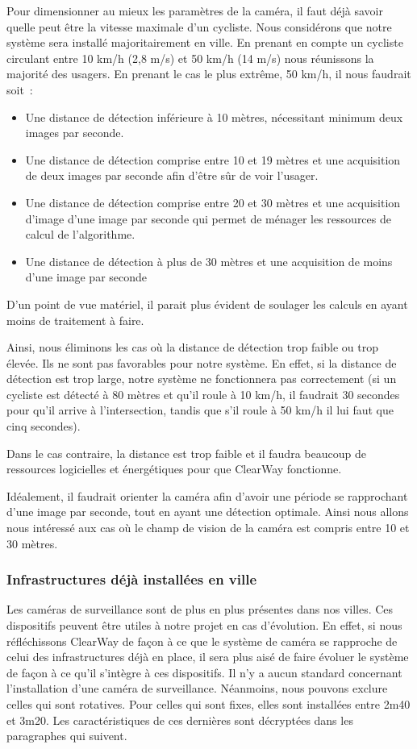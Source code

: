 Pour dimensionner au mieux les paramètres de la caméra, il faut déjà savoir quelle peut être la vitesse maximale d’un cycliste.
Nous considérons que notre système sera installé majoritairement en ville.
En prenant en compte un cycliste circulant entre 10 km/h (2,8 m/s) et 50 km/h (14 m/s) nous réunissons la majorité des usagers.
En prenant le cas le plus extrême, 50 km/h, il nous faudrait soit :
\begin{itemize}
    \item Une distance de détection inférieure à 10 mètres, nécessitant minimum deux images par seconde.
    \item Une distance de détection comprise entre 10 et 19 mètres et une acquisition de deux images par seconde afin
          d’être sûr de voir l’usager.
    \item Une distance de détection comprise entre 20 et 30 mètres et une acquisition d’image d'une image par seconde qui permet
          de ménager les ressources de calcul de l’algorithme.
    \item Une distance de détection à plus de 30 mètres et une acquisition de moins d'une image par seconde
\end{itemize}
D'un point de vue matériel, il parait plus évident de soulager les calculs en ayant moins de traitement à faire.

Ainsi, nous éliminons les cas où la distance de détection trop faible ou trop élevée. Ils ne sont pas favorables pour notre système. 
En effet, si la distance de détection est trop large, notre système ne fonctionnera pas correctement (si un cycliste est détecté à 80 mètres et qu'il roule à 10 km/h, 
il faudrait 30 secondes pour qu'il arrive à l'intersection, tandis que s'il roule à 50 km/h il lui faut que cinq secondes). 

Dans le cas contraire, la distance est trop faible et il faudra beaucoup de ressources logicielles et énergétiques pour que ClearWay fonctionne.

Idéalement, il faudrait orienter la caméra afin d'avoir une période se rapprochant d'une image par seconde, tout en ayant une détection optimale.
Ainsi nous allons nous intéressé aux cas où le champ de vision de la caméra est compris entre 10 et 30 mètres.

\subsubsection{Infrastructures déjà installées en ville}
\label{sec:camera_infra}
Les caméras de surveillance sont de plus en plus présentes dans nos villes. Ces dispositifs peuvent être utiles à notre projet en cas d'évolution.
En effet, si nous réfléchissons ClearWay de façon à ce que le système de caméra se rapproche de celui des infrastructures déjà en place, 
il sera plus aisé de faire évoluer le système de façon à ce qu'il s'intègre à ces dispositifs.
Il n'y a aucun standard concernant l'installation d'une caméra de surveillance. Néanmoins, nous pouvons exclure celles qui sont rotatives. 
Pour celles qui sont fixes, elles sont installées entre 2m40 et 3m20. Les caractéristiques de ces dernières sont décryptées dans les paragraphes qui suivent.

